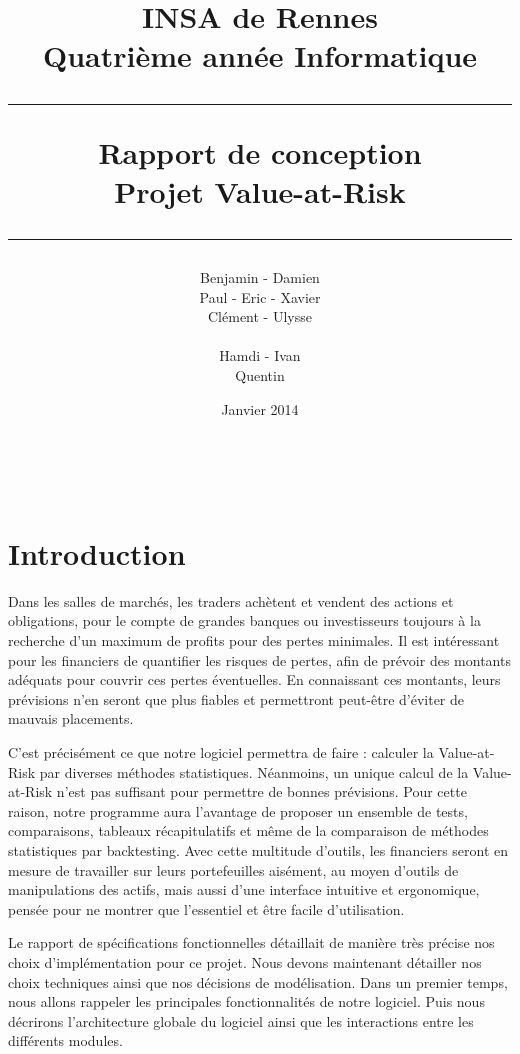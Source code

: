 \documentclass[a4paper,titlepage,french]{report}
\title{INSA de Rennes \\ Quatrième année Informatique \\ \bigskip \hrule \bigskip Rapport de conception \\ \bigskip Projet Value-at-Risk \bigskip \hrule}
\author{Benjamin \bsc{Bouguet} - Damien \bsc{Carduner} \\Paul \bsc{Chaignon} - Eric \bsc{Chauty} - Xavier \bsc{Fraboulet} \\ Clément \bsc{Gautrais} - Ulysse \bsc{Goarant} \\ ~~\\
Hamdi \bsc{Raissi} - Ivan \bsc{Le Plumey} \\ Quentin \bsc{Giai Gianetto}}
\date{Janvier 2014}
\begin{document}
\maketitle

\thispagestyle{empty}
\newpage

~~
\thispagestyle{empty}
\newpage

\tableofcontents
\newpage

\listoffigures
\newpage



\chapter*{Introduction}

Dans les salles de marchés, les traders achètent et vendent des actions et obligations, pour le compte de grandes banques ou investisseurs toujours à la recherche d'un maximum de profits pour des pertes minimales.
Il est intéressant pour les financiers de quantifier les risques de pertes, afin de prévoir des montants adéquats pour couvrir ces pertes éventuelles.
En connaissant ces montants, leurs prévisions n'en seront que plus fiables et permettront peut-être d'éviter de mauvais placements.

C'est précisément ce que notre logiciel permettra de faire : calculer la Value-at-Risk par diverses méthodes statistiques.
Néanmoins, un unique calcul de la Value-at-Risk n'est pas suffisant pour permettre de bonnes prévisions.
Pour cette raison, notre programme aura l'avantage de proposer un ensemble de tests, comparaisons, tableaux récapitulatifs et même de la comparaison de méthodes statistiques par backtesting.
Avec cette multitude d'outils, les financiers seront en mesure de travailler sur leurs portefeuilles aisément, au moyen d'outils de manipulations des actifs, mais aussi d'une interface intuitive et ergonomique, pensée pour ne montrer que l'essentiel et être facile d'utilisation.

Le rapport de spécifications fonctionnelles détaillait de manière très précise nos choix d'implémentation pour ce projet.
Nous devons maintenant détailler nos choix techniques ainsi que nos décisions de modélisation.
Dans un premier temps, nous allons rappeler les principales fonctionnalités de notre logiciel.
Puis nous décrirons l'architecture globale du logiciel ainsi que les interactions entre les différents modules.
\end{document}
